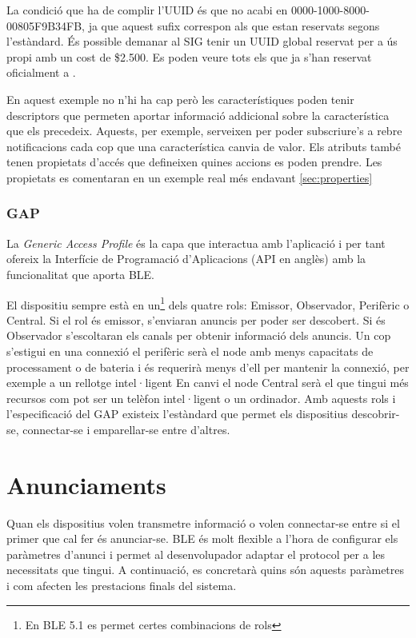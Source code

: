 La condició que ha de complir l'UUID és que no acabi en 0000-1000-8000-00805F9B34FB, ja que aquest sufix correspon als que estan reservats segons l'estàndard.
És possible demanar al SIG tenir un UUID global reservat per a ús propi amb un cost de \$2.500.
Es poden veure tots els que ja s'han reservat oficialment a \cite{reservedUUIDs}.

En aquest exemple no n'hi ha cap però les característiques poden tenir descriptors \cite{descriptors} que permeten aportar informació addicional sobre la característica que els precedeix.
Aquests, per exemple, serveixen per poder subscriure's a rebre notificacions cada cop que una característica canvia de valor.
Els atributs també tenen propietats d'accés que defineixen quines accions es poden prendre.
Les propietats es comentaran en un exemple real més endavant \ref{sec:properties}

\subsubsection{GAP}
\label{GAP}
La \textit{Generic Access Profile} és la capa que interactua amb l'aplicació i per tant ofereix la Interfície de Programació d'Aplicacions (API en anglès) amb la funcionalitat que aporta BLE.

El dispositiu sempre està en un\footnote{En BLE 5.1 es permet certes combinacions de rols} dels quatre rols: Emissor, Observador, Perifèric o Central.
Si el rol és emissor, s'enviaran anuncis per poder ser descobert.
Si és Observador s'escoltaran els canals per obtenir informació dels anuncis.
Un cop s'estigui en una connexió el perifèric serà el node amb menys capacitats de processament o de bateria i és requerirà menys d'ell per mantenir la connexió, per exemple a un rellotge intel·ligent
En canvi el node Central serà el que tingui més recursos com pot ser un telèfon intel·ligent o un ordinador.
Amb aquests rols i l'especificació del GAP existeix l'estàndard que permet els dispositius descobrir-se, connectar-se i emparellar-se entre d'altres.


\section{Anunciaments}
Quan els dispositius volen transmetre informació o volen connectar-se entre si el primer que cal fer és anunciar-se.
BLE és molt flexible a l'hora de configurar els paràmetres d'anunci i permet al desenvolupador adaptar el protocol per a les necessitats que tingui.
A continuació, es concretarà quins són aquests paràmetres i com afecten les prestacions finals del sistema.

